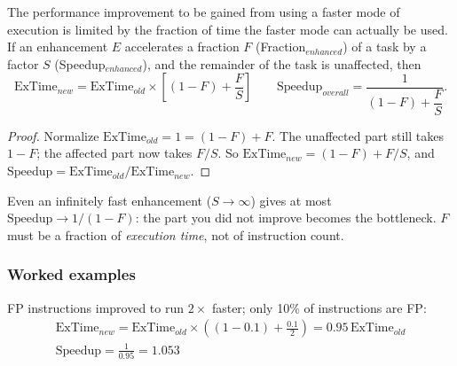 \begin{theorem}
The performance improvement to be gained from using a faster mode of
execution is limited by the fraction of time the faster mode can actually be
used. If an enhancement $E$ accelerates a fraction $F$ (Fraction$_{enhanced}$)
of a task by a factor $S$ (Speedup$_{enhanced}$), and the remainder of the
task is unaffected, then
\[
  \text{ExTime}_{new} = \text{ExTime}_{old} \times \left[(1-F) +
  \frac{F}{S}\right]
  \qquad
  \text{Speedup}_{overall} = \frac{1}{(1-F) + \dfrac{F}{S}}.
\]
\end{theorem}

\begin{proof}
Normalize $\text{ExTime}_{old}=1=(1-F)+F$. The unaffected part still takes
$1-F$; the affected part now takes $F/S$. So $\text{ExTime}_{new} =
(1-F)+F/S$, and $\text{Speedup} = \text{ExTime}_{old}/\text{ExTime}_{new}$.
\end{proof}

\begin{explanation}
Even an infinitely fast enhancement ($S\to\infty$) gives at most
$\text{Speedup}\to 1/(1-F)$: the part you did not improve becomes the
bottleneck. $F$ must be a fraction of \emph{execution time}, not of
instruction count.
\end{explanation}

\begin{center}
\end{center}

\subsubsection{Worked examples}

\begin{eg}
FP instructions improved to run $2\times$ faster; only 10\% of instructions
are FP:
\begin{gather*}
  \text{ExTime}_{new} = \text{ExTime}_{old}\times\left((1-0.1) +
  \frac{0.1}{2}\right) = 0.95\,\text{ExTime}_{old}\\
  \text{Speedup} = \frac{1}{0.95} = 1.053
\end{gather*}
\end{eg}

